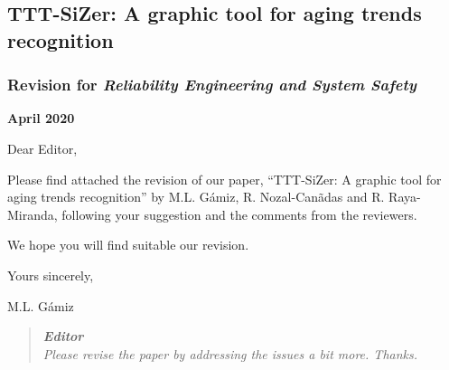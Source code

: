 \documentclass[12pt]{article}
\begin{document}
\begin{center}
 {\Large\bf }
\vskip 0.2cm

\subsection* {TTT-SiZer: A graphic tool for aging trends recognition}
\subsubsection*{Revision for {\em Reliability Engineering and System Safety}}
\vskip 0.2cm

{\bf April 2020}
\end{center}
\vskip 0.5cm

\date{\ }

\noindent Dear Editor, \vskip 0.3cm

\noindent Please find attached the revision of our paper, ``TTT-SiZer: A graphic tool for aging trends recognition'' by M.L. G\'amiz, R. Nozal-Can\~adas and R. Raya-Miranda, following your suggestion and the comments from the reviewers.
\bigskip

We hope you will find suitable our revision. 
\bigskip

\vskip 0.3cm
\noindent Yours sincerely,

M.L. G\'amiz

\vskip 0.5cm
\newpage
\date{\ }
 
\begin{quote}
\emph{ {\bf Editor }\\
 Please revise the paper by addressing the issues a bit more. Thanks.}

\end{quote}
\end{document}
